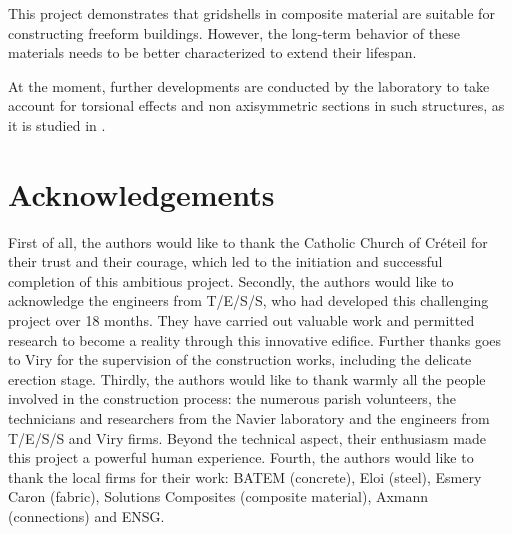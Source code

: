 This project demonstrates that gridshells in composite material are suitable for constructing freeform buildings. However, the long-term behavior of these materials needs to be better characterized to extend their lifespan.

At the moment, further developments are conducted by the laboratory to take account for torsional effects and non axisymmetric sections in such structures, as it is studied in \cite{Barnes2013}.

\section{Acknowledgements}
First of all, the authors would like to thank the Catholic Church of Créteil for their trust and their courage, which led to the initiation and successful completion of this ambitious project. Secondly, the authors would like to acknowledge the engineers from T/E/S/S, who had developed this challenging project over 18 months. They have carried out valuable work and permitted research to become a reality through this innovative edifice. Further thanks goes to Viry for the supervision of the construction works, including the delicate erection stage. Thirdly, the authors would like to thank warmly all the people involved in the construction process: the numerous parish volunteers, the technicians and researchers from the Navier laboratory and the engineers from T/E/S/S and Viry firms. Beyond the technical aspect, their enthusiasm made this project a powerful human experience. Fourth, the authors would like to thank the local firms for their work: BATEM (concrete), Eloi (steel), Esmery Caron (fabric), Solutions Composites (composite material), Axmann (connections) and ENSG. 



